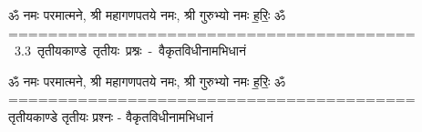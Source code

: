 \documentclass[17pt]{extarticle}
\begin{document}
\begin{titlepage}
    \begin{center}
 
\begin{sanskrit}
    { \Large
    ॐ नमः परमात्मने, श्री महागणपतये नमः, श्री गुरुभ्यो नमः
ह॒रिः॒ ॐ
========================================= 
    }
    \\
    \vspace{2.5cm}
    \mbox{ \Huge
    3.3     तृतीयकाण्डे तृतीयः प्रश्नः - वैकृतविधीनामभिधानं   }
\end{sanskrit}
\end{center}

\end{titlepage}
\tableofcontents

ॐ नमः परमात्मने, श्री महागणपतये नमः, श्री गुरुभ्यो नमः
ह॒रिः॒ ॐ
=========================================      तृतीयकाण्डे तृतीयः प्रश्नः - वैकृतविधीनामभिधानं \newline

\end{document}
